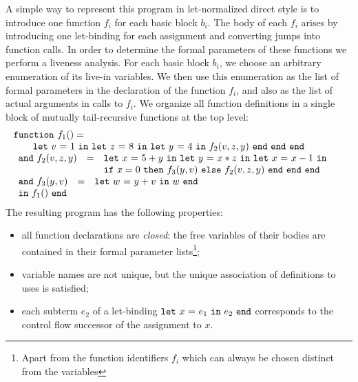 A simple way to represent this program in let-normalized direct style
is to introduce one function $f_i$ for each basic block $b_i$. The
body of each $f_i$ arises by introducing one let-binding for each
assignment and converting jumps into function calls. In order to
determine the formal parameters of these functions we perform a
liveness analysis. For each basic block $b_i$, we choose an arbitrary
enumeration of its live-in variables. We then use this enumeration as
the list of formal parameters in the declaration of the function
$f_i$, and also as the list of actual arguments in calls to $f_i$. We
organize all function definitions in a single block of mutually
tail-recursive functions at the top level:
\begin{equation}
\label{FunctionalConstructionProgram1}
\begin{array}{l}
  \mathtt{function}\ f_1() = \\ \qquad
   \letin v 1 {
              \letin z 8 {
                 \letin y 4 {\call {f_2} {v,z,y}}
              }
            }
\\
\begin{array}{lcl}
\mathtt{and}\ f_2(v,z,y) & = & 
  \letinD x {5+y} {
              \letinD y {x*z} {
                 \letinD x {x-1} {}}}\\ & & 
   \ite {x=0} {\call {f_3} {y,v}} 
              {\call {f_2} {v,z,y}}\ \mathtt{end}\ \mathtt{end}\ \mathtt{end}
\end{array}\\
\begin{array}{lcl}
  \mathtt{and}\ f_3(y,v) & = & \letin w {y+v} w\\
  \mathtt{in}\ f_1()\ \mathtt{end}
\end{array} 
\end{array}
\end{equation}
The resulting program has the following properties:
\begin{itemize}
\item all function declarations are \emph{closed}: the free variables of their bodies are contained in their formal parameter lists\footnote{Apart from the function identifiers $f_i$ which can always be chosen distinct from the variables};
\item variable names are not unique, but the unique association of definitions to uses is satisfied;
\item each subterm $e_2$ of a let-binding $\mathtt{let}\ {x}\ \mathtt{=}\ {e_1}\ \mathtt{in}\ {e_2}\ \mathtt{end}$ corresponds to the control flow successor of the assignment to $x$.
\end{itemize}
